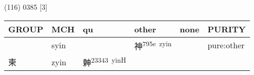 \documentclass[14pt,a4paper]{scrartcl}
\begin{document}
(116) 0385 {[}3{]}

\begin{longtable}[c]{@{}llllll@{}}
\toprule
\begin{minipage}[b]{0.14\columnwidth}\raggedright\strut
GROUP
\strut\end{minipage} &
\begin{minipage}[b]{0.14\columnwidth}\raggedright\strut
MCH
\strut\end{minipage} &
\begin{minipage}[b]{0.14\columnwidth}\raggedright\strut
qu
\strut\end{minipage} &
\begin{minipage}[b]{0.14\columnwidth}\raggedright\strut
other
\strut\end{minipage} &
\begin{minipage}[b]{0.14\columnwidth}\raggedright\strut
none
\strut\end{minipage} &
\begin{minipage}[b]{0.14\columnwidth}\raggedright\strut
PURITY
\strut\end{minipage}\tabularnewline
\midrule
\endhead
\begin{minipage}[t]{0.14\columnwidth}\raggedright\strut
𢑚
\strut\end{minipage} &
\begin{minipage}[t]{0.14\columnwidth}\raggedright\strut
syin
\strut\end{minipage} &
\begin{minipage}[t]{0.14\columnwidth}\raggedright\strut
\strut\end{minipage} &
\begin{minipage}[t]{0.14\columnwidth}\raggedright\strut
神\textsuperscript{795e~zyin}
\strut\end{minipage} &
\begin{minipage}[t]{0.14\columnwidth}\raggedright\strut
\strut\end{minipage} &
\begin{minipage}[t]{0.14\columnwidth}\raggedright\strut
pure:other
\strut\end{minipage}\tabularnewline
\begin{minipage}[t]{0.14\columnwidth}\raggedright\strut
柬
\strut\end{minipage} &
\begin{minipage}[t]{0.14\columnwidth}\raggedright\strut
zyin
\strut\end{minipage} &
\begin{minipage}[t]{0.14\columnwidth}\raggedright\strut
𣍃\textsuperscript{23343~yinH}

\end{minipage}
\end{longtable}
\end{document}
